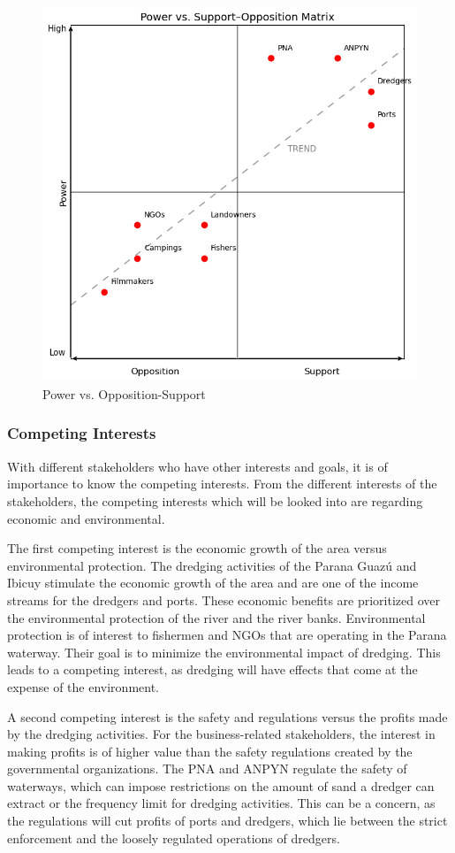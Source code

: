 \begin{figure}[H]
    \centering
    \includegraphics[width=0.70\linewidth]{figures/ch3/Support-OppositionVSPower.png}
    \caption{Power vs. Opposition-Support}
    \label{fig:support-opposition-power}
\end{figure}

\newpage

\subsubsection{Competing Interests}

With different stakeholders who have other interests and goals, it is of importance to know the competing interests. From the different interests of the stakeholders, the competing interests which will be looked into are regarding economic and environmental.

The first competing interest is the economic growth of the area versus environmental protection. The dredging activities of the Parana Guazú and Ibicuy stimulate the economic growth of the area and are one of the income streams for the dredgers and ports. These economic benefits are prioritized over the environmental protection of the river and the river banks. Environmental protection is of interest to fishermen and NGOs that are operating in the Parana waterway. Their goal is to minimize the environmental impact of dredging. This leads to a competing interest, as dredging will have effects that come at the expense of the environment.

A second competing interest is the safety and regulations versus the profits made by the dredging activities. For the business-related stakeholders, the interest in making profits is of higher value than the safety regulations created by the governmental organizations. The PNA and ANPYN regulate the safety of waterways, which can impose restrictions on the amount of sand a dredger can extract or the frequency limit for dredging activities. This can be a concern, as the regulations will cut profits of ports and dredgers, which lie between the strict enforcement and the loosely regulated operations of dredgers.

